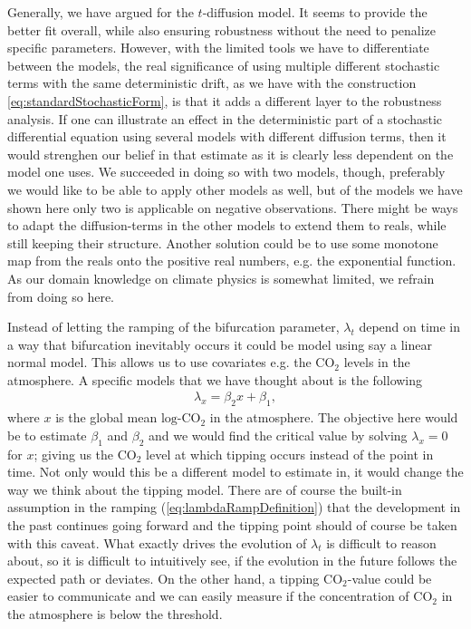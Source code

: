 Generally, we have argued for the $t$-diffusion model. It seems to provide the better fit overall, while also ensuring robustness without the need to penalize specific parameters. However, with the limited tools we have to differentiate between the models, the real significance of using multiple different stochastic terms with the same deterministic drift, as we have with the construction \ref{eq:standardStochasticForm}, is that it adds a different layer to the robustness analysis. If one can illustrate an effect in the deterministic part of a stochastic differential equation using several models with different diffusion terms, then it would strenghen our belief in that estimate as it is clearly less dependent on the model one uses. We succeeded in doing so with two models, though, preferably we would like to be able to apply other models as well, but of the models we have shown here only two is applicable on negative observations. There might be ways to adapt the diffusion-terms in the other models to extend them to reals, while still keeping their structure. Another solution could be to use some monotone map from the reals onto the positive real numbers, e.g. the exponential function. As our domain knowledge on climate physics is somewhat limited, we refrain from doing so here.

Instead of letting the ramping of the bifurcation parameter, $\lambda_t$ depend on time in a way that bifurcation inevitably occurs it could be model using say a linear normal model. This allows us to use covariates e.g. the $\mathrm{CO}_2$ levels in the atmosphere. A specific models that we have thought about is the following
\begin{align}
    \lambda_x= \beta_2 x + \beta_1, \label{eq:alternativeLambda}
\end{align}
where $x$ is the global mean $\mathrm{log}$-$\mathrm{CO}_2$ in the atmosphere. The objective here would be to estimate $\beta_1$ and $\beta_2$ and we would find the critical value by solving $\lambda_x = 0$ for $x$; giving us the $\mathrm{CO}_2$ level at which tipping occurs instead of the point in time. Not only would this be a different model to estimate in, it would change the way we think about the tipping model. There are of course the built-in assumption in the ramping (\ref{eq:lambdaRampDefinition}) that the development in the past continues going forward and the tipping point should of course be taken with this caveat. What exactly drives the evolution of $\lambda_t$ is difficult to reason about, so it is difficult to intuitively see, if the evolution in the future follows the expected path or deviates. 
On the other hand, a tipping $\mathrm{CO}_2$-value could be easier to communicate and we can easily measure if the concentration of $\mathrm{CO}_2$ in the atmosphere is below the threshold. 

